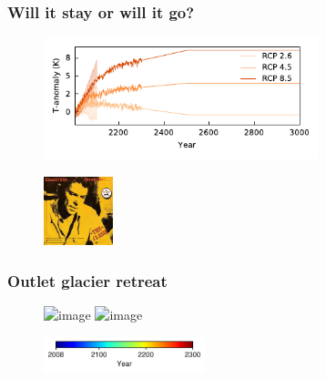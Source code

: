 \documentclass[hide notes,intlimits]{beamer}
\begin{document}
\begin{frame}
  \frametitle{Will it stay or will it go?}
  \begin{figure}
    \includegraphics[width=8cm]{giss_cmip5_delta_T}
  \end{figure}
  \begin{figure}
    \includegraphics[width=2cm]{clash}
  \end{figure}
\end{frame}



\begin{frame}
  \frametitle{Outlet glacier retreat}
  \begin{figure}
    \includegraphics<1>[height=7.25cm]{rcp45_Upernavik_Isstrom_S}
    \includegraphics<2>[height=7.25cm]{rcp45_Store_Gletscher}
  \end{figure}
  \vspace{-0.5cm}
  \begin{figure}
    \includegraphics[height=1cm]{jet_horizontal}
  \end{figure}
\end{frame}
\end{document}
